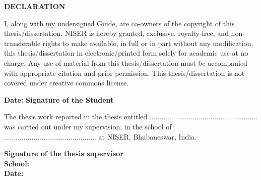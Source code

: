 \begin{center}
{\bf DECLARATION}
\end{center}

I, along with my undersigned Guide, are co-owners of the copyright of this thesis/dissertation. NISER is hereby granted, exclusive, royalty-free, and non-transferable rights to make available, in full or in part without any modification, this thesis/dissertation in electronic/printed form solely for academic use at no charge. Any use of material from this thesis/dissertation must be accompanied with appropriate citation and prior permission. This thesis/dissertation is not covered under creative commons license. 

\vskip1.0in
\hspace*{0.01in} {\textbf{Date:}}
\hspace*{3.2in} {\textbf{Signature of the Student}} \\


\vskip1.0in
\vskip1.0in

The thesis work reported in the thesis entitled ....................................................... was carried out under my supervision, in the school of ............................................... at NISER, Bhubaneswar, India.



\vskip1.0in

\hspace*{3in} {\textbf{Signature of the thesis supervisor}} \\
\hspace*{3in} {\textbf{School:}}\\
\hspace*{3in} {\textbf{Date:}}